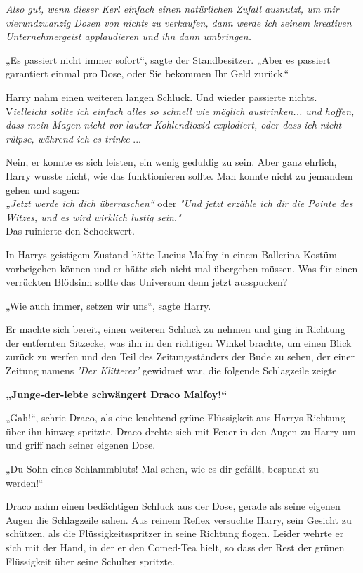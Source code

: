 {\emph{Also gut, wenn dieser Kerl einfach einen natürlichen Zufall ausnutzt, um mir vierundzwanzig Dosen von nichts zu verkaufen, dann werde ich seinem kreativen Unternehmergeist applaudieren und ihn dann umbringen.}

„Es passiert nicht immer sofort“, sagte der Standbesitzer. „Aber es passiert garantiert einmal pro Dose, oder Sie bekommen Ihr Geld zurück.“

Harry nahm einen weiteren langen Schluck. Und wieder passierte nichts. V\emph{ielleicht sollte ich einfach alles so schnell wie möglich austrinken... und hoffen, dass mein Magen nicht vor lauter Kohlendioxid explodiert, oder dass ich nicht rülpse, während ich es trinke} ...

Nein, er konnte es sich leisten, ein wenig geduldig zu sein. Aber ganz ehrlich, Harry wusste nicht, wie das funktionieren sollte. Man konnte nicht zu jemandem gehen und sagen:\\ \emph{„Jetzt werde ich dich überraschen“} oder \emph{"Und jetzt erzähle ich dir die Pointe des Witzes, und es wird wirklich lustig sein."}\\ Das ruinierte den Schockwert.

In Harrys geistigem Zustand hätte Lucius Malfoy in einem Ballerina-Kostüm vorbeigehen können und er hätte sich nicht mal übergeben müssen. Was für einen verrückten Blödsinn sollte das Universum denn jetzt ausspucken?

„Wie auch immer, setzen wir uns“, sagte Harry.

Er machte sich bereit, einen weiteren Schluck zu nehmen und ging in Richtung der entfernten Sitzecke, was ihn in den richtigen Winkel brachte, um einen Blick zurück zu werfen und den Teil des Zeitungsständers der Bude zu sehen, der einer Zeitung namens \emph{'Der Klitterer'} gewidmet war, die folgende Schlagzeile zeigte

\textbf{„Junge-der-lebte schwängert Draco Malfoy!“}

„Gah!“, schrie Draco, als eine leuchtend grüne Flüssigkeit aus Harrys Richtung über ihn hinweg spritzte. Draco drehte sich mit Feuer in den Augen zu Harry um und griff nach seiner eigenen Dose.

„Du Sohn eines Schlammbluts! Mal sehen, wie es dir gefällt, bespuckt zu werden!“

Draco nahm einen bedächtigen Schluck aus der Dose, gerade als seine eigenen Augen die Schlagzeile sahen. Aus reinem Reflex versuchte Harry, sein Gesicht zu schützen, als die Flüssigkeitsspritzer in seine Richtung flogen. Leider wehrte er sich mit der Hand, in der er den Comed-Tea hielt, so dass der Rest der grünen Flüssigkeit über seine Schulter spritzte.

}
